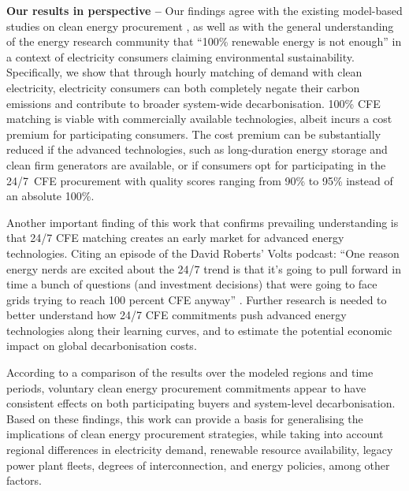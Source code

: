 \textbf{Our results in perspective --} Our findings agree with the existing model-based studies on clean energy procurement \cite{xu-247CFE-SSRN,ieaAdvancingDecarbonisationClean2022,peninsula-report247}, as well as with the general understanding of the energy research community that \enquote{100\% renewable energy is not enough} \cite{chalendar-2019} in a context of electricity consumers claiming environmental sustainability. 
Specifically, we show that through hourly matching of demand with clean electricity, electricity consumers can both completely negate their carbon emissions and contribute to broader system-wide decarbonisation. 
100\% CFE matching is viable with commercially available technologies, albeit incurs a cost premium for participating consumers.
The cost premium can be substantially reduced if the advanced technologies, such as long-duration energy storage and clean firm generators are available, or if consumers opt for participating in the 24/7~CFE procurement with quality scores ranging from 90\% to 95\% instead of an absolute 100\%.

Another important finding of this work that confirms prevailing understanding is that 24/7 CFE matching creates an early market for advanced energy technologies. Citing an episode of the David Roberts' Volts podcast: \enquote{One reason energy nerds are excited about the 24/7 trend is that it's going to pull forward in time a bunch of questions (and investment decisions) that were going to face grids trying to reach 100 percent CFE anyway} \cite{roberts-intro247CFE}. Further research is needed to better understand how 24/7 CFE commitments push advanced energy technologies along their learning curves, and to estimate the potential economic impact on global decarbonisation costs.

According to a comparison of the results over the modeled regions and time periods, voluntary clean energy procurement commitments appear to have consistent effects on both participating buyers and system-level decarbonisation.
Based on these findings, this work can provide a basis for generalising the implications of clean energy procurement strategies, while taking into account regional differences in electricity demand, renewable resource availability, legacy power plant fleets, degrees of interconnection, and energy policies, among other factors.

